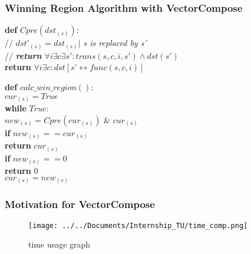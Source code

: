 \documentclass{beamer}
\begin{document}
\begin{frame}
\frametitle{Winning Region Algorithm with VectorCompose}

\textbf{def} $Cpre(dst_{(s)}):$ \\
\noindent\hspace*{6mm} // {\small  \emph{ \color{gray} $dst'_{(s)} = dst_{(s)}|$ s is replaced by s'}}\\
\noindent\hspace*{6mm} // {\small  \emph{ \color{gray}\textbf{return} $\forall i \exists c \exists s': trans( s, c, i, s' ) \wedge dst(s')$}} \\
\noindent\hspace*{6mm} \textbf{return} $\forall i \exists c : dst[s’ \leftrightarrow func(s, c, i) ]$\\

\bigskip

\textbf{def} $calc\_win\_region(): $\\
\noindent\hspace*{6mm} $cur_{(s)} = True$  \\
\noindent\hspace*{6mm} \textbf{while} $True:$ \\
\noindent\hspace*{12mm} $new_{(s)} = Cpre(cur_{(s)})$ \& $cur_{(s)} $ \\
\noindent\hspace*{12mm} \textbf{if} $ new_{(s)} == cur_{(s)}$ \\
\noindent\hspace*{18mm} \textbf{return} $cur_{(s)}$\\
\noindent\hspace*{12mm} \textbf{if} $ new_{(s)} == 0$ \\
\noindent\hspace*{18mm} \textbf{return} $0$\\
\noindent\hspace*{12mm} $cur_{(s)} = new_{(s)}$

\end{frame}

\begin{frame}
\frametitle{Motivation for VectorCompose}

\begin{figure}

\texttt{[image: ../../Documents/Internship\_TU/time\_comp.png]} 
\caption{time usage graph}

\end{figure}
\end{frame}
\end{document}

